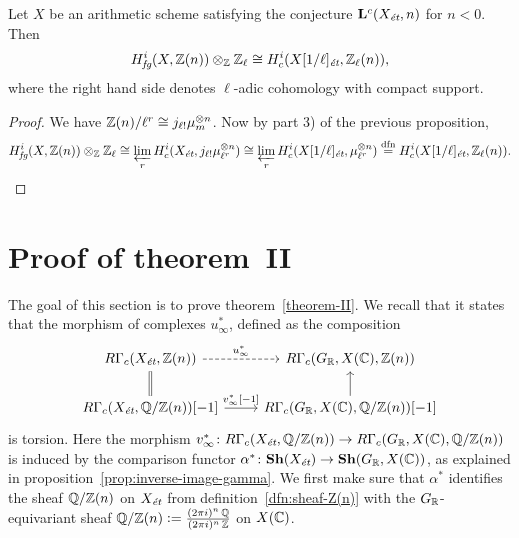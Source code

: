 \documentclass{article}
\numberwithin{equation}{section}
\begin{document}
\begin{corollary}
  \label{cor:RGamma-fg-model-for-l-adic-cohomology}
  Let $X$ be an arithmetic scheme satisfying the conjecture
  $\mathbf{L}^c (X_\et, n)$ for $n < 0$. Then
  $$H_\fg^i (X, \ZZ (n)) \otimes_\ZZ \ZZ_\ell \cong H^i_c (X [1/\ell]_\et, \ZZ_\ell (n)),$$
  where the right hand side denotes $\ell$-adic cohomology with compact support.

  \begin{proof}
    We have $\ZZ (n)/\ell^r \cong j_{\ell!} \mu_m^{\otimes n}$.
    Now by part 3) of the previous proposition,
    \[ H_\fg^i (X, \ZZ (n)) \otimes_\ZZ \ZZ_\ell \cong
      \varprojlim_r H_c^i (X_\et, j_{\ell!} \mu_{\ell^r}^{\otimes n}) \cong
      \varprojlim_r H_c^i (X [1/\ell]_\et, \mu_{\ell^r}^{\otimes n})
      \stackrel{\text{dfn}}{=} H_c^i (X [1/\ell]_\et, \ZZ_\ell (n)). \qedhere \]
  \end{proof}
\end{corollary}


\section{Proof of theorem~II}
\label{sec:theorem-II}

The goal of this section is to prove theorem~\ref{theorem-II}. We recall that it
states that the morphism of complexes $u_\infty^*$, defined as the composition
\[ \begin{tikzcd}
  R\Gamma_c (X_\et, \ZZ(n)) \ar[equals]{d}\ar[dashed]{r}{u_\infty^*} & R\Gamma_c (G_\RR, X (\CC), \ZZ (n)) \\
  R\Gamma_c (X_\et, \QQ/\ZZ (n)) [-1] \ar{r}{v_\infty^* [-1]} & R\Gamma_c (G_\RR, X (\CC), \QQ/\ZZ (n)) [-1] \ar{u}
\end{tikzcd} \]
is torsion. Here the morphism
$v_\infty^*\colon R\Gamma_c (X_\et, \QQ/\ZZ (n)) \to R\Gamma_c (G_\RR, X (\CC), \QQ/\ZZ (n))$
is induced by the comparison functor
$\alpha^*\colon \mathbf{Sh} (X_\et) \to \mathbf{Sh} (G_\RR, X (\CC))$, as
explained in proposition~\ref{prop:inverse-image-gamma}. We first make sure that
$\alpha^*$ identifies the sheaf $\QQ/\ZZ (n)$ on $X_\et$ from
definition~\ref{dfn:sheaf-Z(n)} with the $G_\RR$-equivariant sheaf
$\QQ/\ZZ (n) \dfn \frac{(2\pi i)^n\,\QQ}{(2\pi i)^n\,\ZZ}$ on $X (\CC)$.
\end{document}
